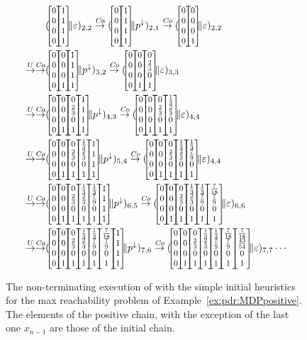 \begin{example}
	\begin{figure}[t]
		{\footnotesize
			\begin{align*}
				                       & (\cvec{0}{0}{0}{0}\cvec{1}{1}{1}{1} \| \varepsilon)_{2,2} \tr{\mathit{Ca}} (\cvec{0}{0}{0}{0}\cvec{1}{1}{1}{1} \| p^\downarrow )_{2,1}
				\tr{\mathit{Co}} (\cvec{0}{0}{0}{0}\cvec{0}{0}{0}{1} \| \varepsilon)_{2,2}                                                                                                                                                                         \\
				\tr{U}\tr{\mathit{Ca}} & (\cvec{0}{0}{0}{0}\cvec{0}{0}{0}{1} \cvec{1}{1}{1}{1} \| p^\downarrow )_{3,2}
				\tr{\mathit{Co}} (\cvec{0}{0}{0}{0}\cvec{0}{0}{0}{1} \cvec{0}{\frac{2}{3}}{0}{1} \| \varepsilon)_{3,3}                                                                                                                                             \\
				\tr{U}\tr{\mathit{Ca}} & (\cvec{0}{0}{0}{0}\cvec{0}{0}{0}{1} \cvec{0}{\frac{2}{3}}{0}{1} \cvec{1}{1}{1}{1} \| p^\downarrow )_{4,3}
				\tr{\mathit{Co}} (\cvec{0}{0}{0}{0}\cvec{0}{0}{0}{1} \cvec{0}{\frac{2}{3}}{0}{1} \cvec{\frac{1}{3}}{\frac{2}{3}}{0}{1} \| \varepsilon )_{4,4}                                                                                                      \\
				\tr{U}\tr{\mathit{Ca}} & (\cvec{0}{0}{0}{0}\cvec{0}{0}{0}{1} \cvec{0}{\frac{2}{3}}{0}{1} \cvec{\frac{1}{3}}{\frac{2}{3}}{0}{1}\cvec{1}{1}{1}{1} \| p^\downarrow )_{5,4}
				\tr{\mathit{Co}} (\cvec{0}{0}{0}{0}\cvec{0}{0}{0}{1} \cvec{0}{\frac{2}{3}}{0}{1} \cvec{\frac{1}{3}}{\frac{2}{3}}{0}{1}\cvec{\frac{1}{3}}{\frac{7}{9}}{0}{1} \| \varepsilon )_{4,4}                                                                 \\
				\tr{U}\tr{\mathit{Ca}} & (\cvec{0}{0}{0}{0}\cvec{0}{0}{0}{1} \cvec{0}{\frac{2}{3}}{0}{1} \cvec{\frac{1}{3}}{\frac{2}{3}}{0}{1}\cvec{\frac{1}{3}}{\frac{7}{9}}{0}{1}\cvec{1}{1}{1}{1} \| p^\downarrow )_{6,5}
				\tr{\mathit{Co}} (\cvec{0}{0}{0}{0}\cvec{0}{0}{0}{1} \cvec{0}{\frac{2}{3}}{0}{1} \cvec{\frac{1}{3}}{\frac{2}{3}}{0}{1}\cvec{\frac{1}{3}}{\frac{7}{9}}{0}{1}\cvec{\frac{7}{18}}{\frac{7}{9}}{0}{1} \| \varepsilon )_{6,6}                           \\
				\tr{U}\tr{\mathit{Ca}} & (\cvec{0}{0}{0}{0}\cvec{0}{0}{0}{1} \cvec{0}{\frac{2}{3}}{0}{1} \cvec{\frac{1}{3}}{\frac{2}{3}}{0}{1}\cvec{\frac{1}{3}}{\frac{7}{9}}{0}{1}\cvec{\frac{7}{18}}{\frac{7}{9}}{0}{1}\cvec{1}{1}{1}{1} \| p^\downarrow )_{7,6}
				\tr{\mathit{Co}} (\cvec{0}{0}{0}{0}\cvec{0}{0}{0}{1} \cvec{0}{\frac{2}{3}}{0}{1} \cvec{\frac{1}{3}}{\frac{2}{3}}{0}{1}\cvec{\frac{1}{3}}{\frac{7}{9}}{0}{1}\cvec{\frac{7}{18}}{\frac{7}{9}}{0}{1}\cvec{\frac{7}{18}}{\frac{43}{54}}{0}{1} \| \varepsilon )_{7,7}
				\cdots
			\end{align*}
		}
		\caption{The non-terminating execution of {\ADPDR} with the simple initial heuristics for the max reachability problem of Example~\ref{ex:pdr:MDPpositive}. The elements of the positive chain, with the exception of the last one $x_{n-1}$ are those of the initial chain.}
		\label{fig:pdr:exsimpleinitialMDPs}
	\end{figure}


\end{example}
